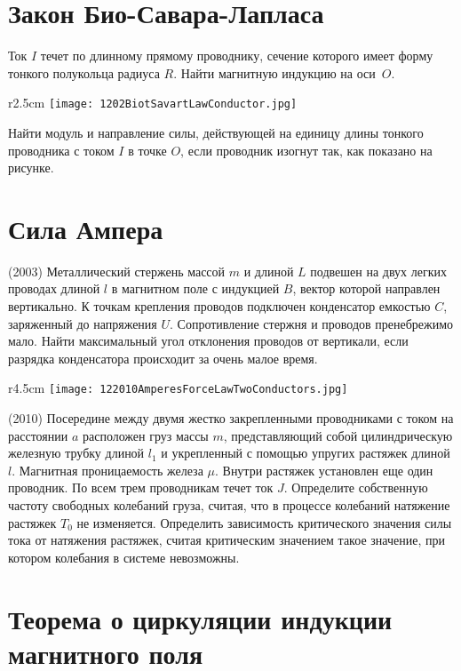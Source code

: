 \section{Закон Био-Савара-Лапласа}

\AddProb Ток $I$ течет по длинному прямому проводнику, сечение которого имеет форму тонкого полукольца радиуса $R$. Найти магнитную индукцию на оси~$O$.

\begin{wrapfigure}{r}{2.5cm}
\texttt{[image: 1202BiotSavartLawConductor.jpg]}
\end{wrapfigure}

\AddProb Найти модуль и направление силы, действующей на единицу длины тонкого проводника с током $I$ в точке $O$, 
если проводник изогнут так, как показано на рисунке.


\section{Сила Ампера}

\AddProb (2003) Металлический стержень массой $m$ и длиной $L$ подвешен на двух легких проводах длиной $l$ в магнитном поле с индукцией $B$, 
вектор которой направлен вертикально. К точкам крепления проводов подключен конденсатор емкостью $C$, заряженный до напряжения $U$. 
Сопротивление стержня и проводов пренебрежимо мало. Найти максимальный угол отклонения проводов от вертикали, 
если разрядка конденсатора происходит за очень малое время.

\begin{wrapfigure}{r}{4.5cm}
\texttt{[image: 122010AmperesForceLawTwoConductors.jpg]}
\end{wrapfigure}

\AddProb (2010) Посередине между двумя жестко закрепленными проводниками с током на расстоянии $a$ расположен груз массы $m$, 
представляющий собой цилиндрическую железную трубку длиной $l_1$ и укрепленный с помощью упругих растяжек длиной $l$. 
Магнитная проницаемость железа $\mu$. Внутри растяжек установлен еще один проводник. По всем трем проводникам течет ток $J$. 
Определите собственную частоту свободных колебаний груза, считая, что в процессе колебаний натяжение растяжек $T_0$ не изменяется. 
Определить зависимость критического значения силы тока от натяжения растяжек, считая критическим значением такое значение, 
при котором колебания в системе невозможны.


\section{Теорема о циркуляции индукции магнитного поля}

